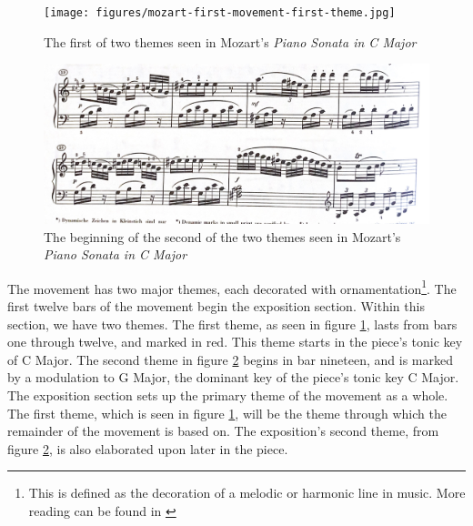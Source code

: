 \begin{figure}
    \centering
    \texttt{[image: figures/mozart-first-movement-first-theme.jpg]}
    \caption{The first of two themes seen in Mozart's \textit{Piano Sonata in C Major}}
    \label{fig:mozart-first-movement-first-theme}
\end{figure}

\begin{figure}
    \centering
    \includegraphics[width=\textwidth]{figures/mozart-first-movement-second-theme.jpg}
    \caption[The second theme in Mozart's \textit{Piano Sonata in C Major, K. 330}]{The beginning of the second of the two themes seen in Mozart's \textit{Piano Sonata in C Major}}
    \label{fig:mozart-first-movement-second-theme}
\end{figure}

The movement has two major themes, each decorated with ornamentation\footnote{This is defined as the decoration of a melodic or harmonic line in music. More reading can be found in \citeauthor{Latham_2011} \autocite{Burkholder_Grout_Palisca_2014}}. The first twelve bars of the movement begin the exposition section. Within this section, we have two themes. The first theme, as seen in figure \ref{fig:mozart-first-movement-first-theme}\autocite{Henle_1977}, lasts from bars one through twelve, and marked in red. This theme starts in the piece's tonic key of C Major. The second theme in figure \ref{fig:mozart-first-movement-second-theme}\autocite{Henle_1977} begins in bar nineteen, and is marked by a modulation to G Major, the dominant key of the piece's tonic key C Major. The exposition section sets up the primary theme of the movement as a whole. The first theme, which is seen in figure \ref{fig:mozart-first-movement-first-theme}\autocite{Henle_1977}, will be the theme through which the remainder of the movement is based on. The exposition's second theme, from figure \ref{fig:mozart-first-movement-second-theme}\autocite{Henle_1977}, is also elaborated upon later in the piece. 

